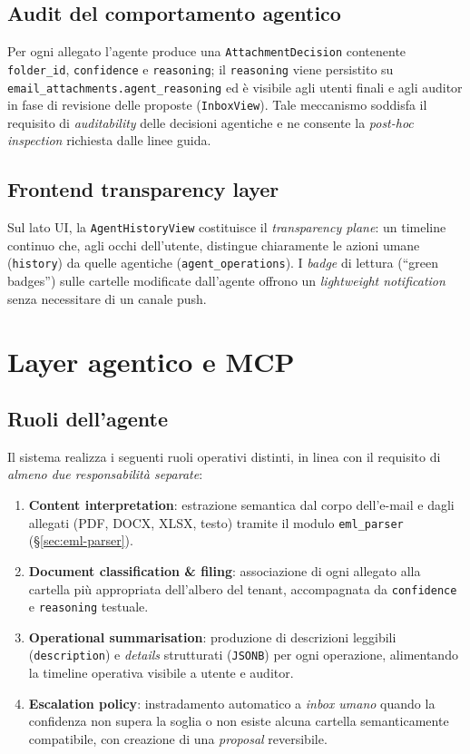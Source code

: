 \documentclass[11pt,a4paper,oneside]{article}
\begin{document}
\subsection{Audit del comportamento agentico}
Per ogni allegato l'agente produce una \texttt{AttachmentDecision} contenente
\texttt{folder\_id}, \texttt{confidence} e \texttt{reasoning}; il \texttt{reasoning}
viene persistito su \texttt{email\_attachments.agent\_reasoning} ed \`e
visibile agli utenti finali e agli auditor in fase di revisione delle proposte
(\texttt{InboxView}). Tale meccanismo soddisfa il requisito di
\emph{auditability} delle decisioni agentiche e ne consente la \emph{post-hoc
inspection} richiesta dalle linee guida.

\subsection{Frontend transparency layer}
Sul lato UI, la \texttt{AgentHistoryView} costituisce il \emph{transparency
plane}: un timeline continuo che, agli occhi dell'utente, distingue chiaramente
le azioni umane (\texttt{history}) da quelle agentiche
(\texttt{agent\_operations}). I \emph{badge} di lettura (``green badges'') sulle
cartelle modificate dall'agente offrono un \emph{lightweight notification}
senza necessitare di un canale push.

\section{Layer agentico e MCP}

\subsection{Ruoli dell'agente}
Il sistema realizza i seguenti ruoli operativi distinti, in linea con il
requisito di \emph{almeno due responsabilit\`a separate}:
\begin{enumerate}[leftmargin=*]
    \item \textbf{Content interpretation}: estrazione semantica dal corpo
          dell'e-mail e dagli allegati (PDF, DOCX, XLSX, testo) tramite il
          modulo \texttt{eml\_parser} (\S\ref{sec:eml-parser}).
    \item \textbf{Document classification \& filing}: associazione di ogni
          allegato alla cartella pi\`u appropriata dell'albero del tenant,
          accompagnata da \texttt{confidence} e \texttt{reasoning} testuale.
    \item \textbf{Operational summarisation}: produzione di descrizioni
          leggibili (\texttt{description}) e \emph{details} strutturati
          (\texttt{JSONB}) per ogni operazione, alimentando la timeline
          operativa visibile a utente e auditor.
    \item \textbf{Escalation policy}: instradamento automatico a
          \emph{inbox umano} quando la confidenza non supera la soglia o non
          esiste alcuna cartella semanticamente compatibile, con creazione di
          una \emph{proposal} reversibile.
\end{enumerate}
\end{document}
